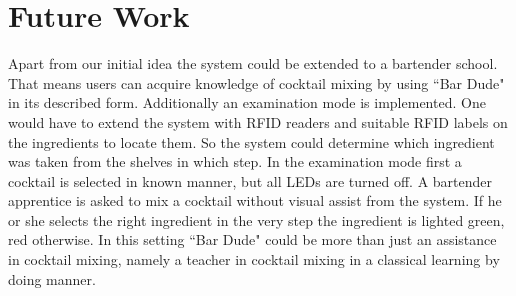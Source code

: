 \documentclass{acm_proc_article-sp}
\begin{document}
\section{Future Work}
Apart from our initial idea the system could be extended to a bartender school. That means users can acquire knowledge of cocktail mixing by using ``Bar Dude" in its described form. Additionally an examination mode is implemented. One would have to extend the system with RFID readers and suitable RFID labels on the ingredients to locate them. So the system could determine which ingredient was taken from the shelves in which step. In the examination mode first a cocktail is selected in known manner, but all LEDs are turned off. A bartender apprentice is asked to mix a cocktail without visual assist from the system. If he or she selects the right ingredient in the very step the ingredient is lighted green, red otherwise. In this setting ``Bar Dude" could be more than just an assistance in cocktail mixing, namely a teacher in cocktail mixing in a classical learning by doing manner.



\end{document}
